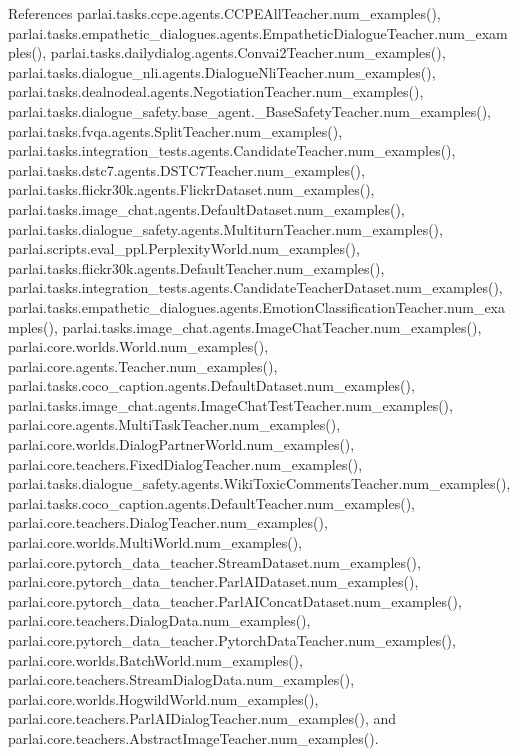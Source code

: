 References parlai.\+tasks.\+ccpe.\+agents.\+C\+C\+P\+E\+All\+Teacher.\+num\+\_\+examples(), parlai.\+tasks.\+empathetic\+\_\+dialogues.\+agents.\+Empathetic\+Dialogue\+Teacher.\+num\+\_\+examples(), parlai.\+tasks.\+dailydialog.\+agents.\+Convai2\+Teacher.\+num\+\_\+examples(), parlai.\+tasks.\+dialogue\+\_\+nli.\+agents.\+Dialogue\+Nli\+Teacher.\+num\+\_\+examples(), parlai.\+tasks.\+dealnodeal.\+agents.\+Negotiation\+Teacher.\+num\+\_\+examples(), parlai.\+tasks.\+dialogue\+\_\+safety.\+base\+\_\+agent.\+\_\+\+Base\+Safety\+Teacher.\+num\+\_\+examples(), parlai.\+tasks.\+fvqa.\+agents.\+Split\+Teacher.\+num\+\_\+examples(), parlai.\+tasks.\+integration\+\_\+tests.\+agents.\+Candidate\+Teacher.\+num\+\_\+examples(), parlai.\+tasks.\+dstc7.\+agents.\+D\+S\+T\+C7\+Teacher.\+num\+\_\+examples(), parlai.\+tasks.\+flickr30k.\+agents.\+Flickr\+Dataset.\+num\+\_\+examples(), parlai.\+tasks.\+image\+\_\+chat.\+agents.\+Default\+Dataset.\+num\+\_\+examples(), parlai.\+tasks.\+dialogue\+\_\+safety.\+agents.\+Multiturn\+Teacher.\+num\+\_\+examples(), parlai.\+scripts.\+eval\+\_\+ppl.\+Perplexity\+World.\+num\+\_\+examples(), parlai.\+tasks.\+flickr30k.\+agents.\+Default\+Teacher.\+num\+\_\+examples(), parlai.\+tasks.\+integration\+\_\+tests.\+agents.\+Candidate\+Teacher\+Dataset.\+num\+\_\+examples(), parlai.\+tasks.\+empathetic\+\_\+dialogues.\+agents.\+Emotion\+Classification\+Teacher.\+num\+\_\+examples(), parlai.\+tasks.\+image\+\_\+chat.\+agents.\+Image\+Chat\+Teacher.\+num\+\_\+examples(), parlai.\+core.\+worlds.\+World.\+num\+\_\+examples(), parlai.\+core.\+agents.\+Teacher.\+num\+\_\+examples(), parlai.\+tasks.\+coco\+\_\+caption.\+agents.\+Default\+Dataset.\+num\+\_\+examples(), parlai.\+tasks.\+image\+\_\+chat.\+agents.\+Image\+Chat\+Test\+Teacher.\+num\+\_\+examples(), parlai.\+core.\+agents.\+Multi\+Task\+Teacher.\+num\+\_\+examples(), parlai.\+core.\+worlds.\+Dialog\+Partner\+World.\+num\+\_\+examples(), parlai.\+core.\+teachers.\+Fixed\+Dialog\+Teacher.\+num\+\_\+examples(), parlai.\+tasks.\+dialogue\+\_\+safety.\+agents.\+Wiki\+Toxic\+Comments\+Teacher.\+num\+\_\+examples(), parlai.\+tasks.\+coco\+\_\+caption.\+agents.\+Default\+Teacher.\+num\+\_\+examples(), parlai.\+core.\+teachers.\+Dialog\+Teacher.\+num\+\_\+examples(), parlai.\+core.\+worlds.\+Multi\+World.\+num\+\_\+examples(), parlai.\+core.\+pytorch\+\_\+data\+\_\+teacher.\+Stream\+Dataset.\+num\+\_\+examples(), parlai.\+core.\+pytorch\+\_\+data\+\_\+teacher.\+Parl\+A\+I\+Dataset.\+num\+\_\+examples(), parlai.\+core.\+pytorch\+\_\+data\+\_\+teacher.\+Parl\+A\+I\+Concat\+Dataset.\+num\+\_\+examples(), parlai.\+core.\+teachers.\+Dialog\+Data.\+num\+\_\+examples(), parlai.\+core.\+pytorch\+\_\+data\+\_\+teacher.\+Pytorch\+Data\+Teacher.\+num\+\_\+examples(), parlai.\+core.\+worlds.\+Batch\+World.\+num\+\_\+examples(), parlai.\+core.\+teachers.\+Stream\+Dialog\+Data.\+num\+\_\+examples(), parlai.\+core.\+worlds.\+Hogwild\+World.\+num\+\_\+examples(), parlai.\+core.\+teachers.\+Parl\+A\+I\+Dialog\+Teacher.\+num\+\_\+examples(), and parlai.\+core.\+teachers.\+Abstract\+Image\+Teacher.\+num\+\_\+examples().

